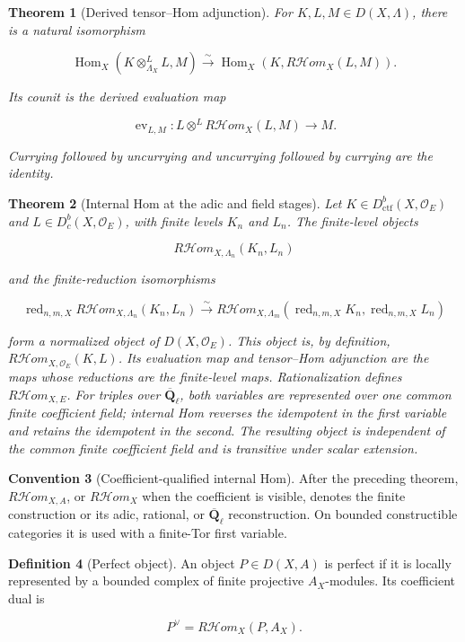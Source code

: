 \documentclass[10pt]{article}
\newtheorem{theorem}{Theorem}[section]
\theoremstyle{definition}
\newtheorem{definition}[theorem]{Definition}
\newtheorem{convention}[theorem]{Convention}
\newcommand{\Qlb}{\overline{\mathbf Q}_\ell}
\newcommand{\OO}{\mathcal O}
\newcommand{\Dbc}{D^b_c}
\newcommand{\Dctf}{D^b_{\mathrm{ctf}}}
\newcommand{\RHom}{R\mathcal Hom}
\newcommand{\red}{\operatorname{red}}
\begin{document}
\begin{theorem}[Derived tensor--Hom adjunction]
For \(K,L,M\in D(X,\Lambda)\), there is a natural isomorphism

\[
 \operatorname{Hom}_X(K\otimes^L_{\Lambda_X}L,M)
 \xrightarrow{\sim}
 \operatorname{Hom}_X(K,\RHom_X(L,M)).
\]

Its counit is the derived evaluation map

\[
 \operatorname{ev}_{L,M}:
 L\otimes^L\RHom_X(L,M)\longrightarrow M.
\]

 Currying followed by uncurrying and uncurrying followed by currying are the
 identity.
\end{theorem}

\begin{theorem}[Internal Hom at the adic and field stages]
Let \(K\in\Dctf(X,\OO_E)\) and \(L\in\Dbc(X,\OO_E)\), with finite
levels \(K_n\) and \(L_n\).  The finite-level objects

\[
 \RHom_{X,\Lambda_n}(K_n,L_n)
\]

and the finite-reduction isomorphisms

\[
 \red_{n,m,X}\RHom_{X,\Lambda_n}(K_n,L_n)
 \xrightarrow{\sim}
 \RHom_{X,\Lambda_m}(\red_{n,m,X}K_n,\red_{n,m,X}L_n)
\]

form a normalized object of \(D(X,\OO_E)\).  This object is, by definition,
\(\RHom_{X,\OO_E}(K,L)\).  Its evaluation map and tensor--Hom adjunction are
the maps whose reductions are the finite-level maps.  Rationalization defines
\(\RHom_{X,E}\).  For triples over \(\Qlb\), both variables are represented
over one common finite coefficient field; internal Hom reverses the idempotent in the
first variable and retains the idempotent in the second.  The resulting
object is independent of the common finite coefficient field and is transitive under
scalar extension.
\end{theorem}

\begin{convention}[Coefficient-qualified internal Hom]
After the preceding theorem, \(\RHom_{X,A}\), or \(\RHom_X\) when the
coefficient is visible, denotes the finite construction or its adic,
rational, or \(\Qlb\) reconstruction.  On bounded constructible categories
it is used with a finite-Tor first variable.
\end{convention}

\begin{definition}[Perfect object]
An object \(P\in D(X,A)\) is perfect if it is locally represented by a
bounded complex of finite projective \(A_X\)-modules.  Its coefficient dual
is

\[
 P^\vee=\RHom_X(P,A_X).
\]
\end{definition}
\end{document}

